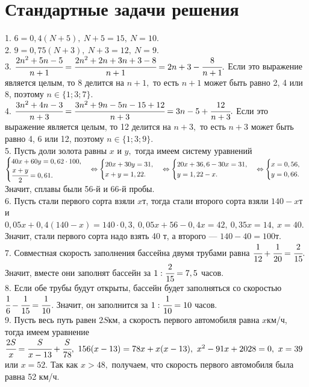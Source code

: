 \documentclass[12pt]{article}
\begin{document}
\section{Стандартные задачи решения}
1. $6=0,4(N+5),\ N+5=15,\ N=10.$\\
2. $9=0,75(N+3),\ N+3=12,\ N=9.$\\
3. $\cfrac{2n^2+5n-5}{n+1}=\cfrac{2n^2+2n+3n+3-8}{n+1}=2n+3-\cfrac{8}{n+1}.$ Если это выражение является целым, то 8 делится на $n+1,$ то есть $n+1$ может быть равно 2, 4 или 8, поэтому $n\in \{1;3;7\}.$\\
4. $\cfrac{3n^2+4n-3}{n+3}=\cfrac{3n^2+9n-5n-15+12}{n+3}=3n-5+\cfrac{12}{n+3}.$ Если это выражение является целым, то 12 делится на $n+3,$ то есть $n+3$ может быть равно 4, 6 или 12, поэтому $n\in \{1;3;9\}.$\\
5. Пусть доли золота равны $x$ и $y,$ тогда имеем систему уравнений $\begin{cases} 40x+60y=0,62\cdot100,\\ \cfrac{x+y}{2}=0,61.\end{cases}\Leftrightarrow
\begin{cases} 20x+30y=31,\\ x+y=1,22.\end{cases}\Leftrightarrow
\begin{cases} 20x+36,6-30x=31,\\ y=1,22-x.\end{cases}\Leftrightarrow
\begin{cases} x=0,56,\\ y=0,66.\end{cases}$
Значит, сплавы были 56-й и 66-й пробы.\\
6. Пусть стали первого сорта взяли $x$т, тогда стали второго сорта взяли $140-x$т и $0,05x+0,4(140-x)=140\cdot0,3,\ 0,05x+56-0,4x=42,\ 0,35x=14,\ x=40.$ Значит, стали первого сорта надо взять 40 т, а второго --- $140-40=100$т.\\
7. Совместная скорость заполнения бассейна двумя трубами равна $\cfrac{1}{12}+\cfrac{1}{20}=\cfrac{2}{15}.$ Значит, вместе они заполнят бассейн за $1:\cfrac{2}{15}=7,5$ часов.\\
8. Если обе трубы будут открыты, бассейн будет заполняться со скоростью $\cfrac{1}{6}-\cfrac{1}{15}=\cfrac{1}{10}$. Значит, он заполнится за $1:\cfrac{1}{10}=10$ часов.\\
9. Пусть весь путь равен $2S$км, а скорость первого автомобиля равна $x$км/ч, тогда имеем уравнение $\cfrac{2S}{x}=\cfrac{S}{x-13}+\cfrac{S}{78},\
156(x-13)=78x+x(x-13),\ x^2-91x+2028=0,\ x=39$ или $x=52.$ Так как $x>48,$ получаем, что скорость первого автомобиля была равна 52 км/ч.\\
\end{document}
